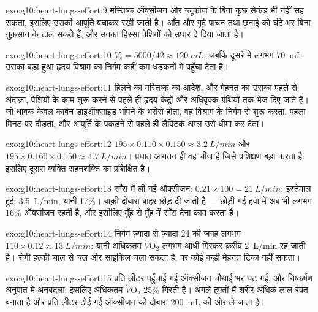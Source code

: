 \begin{solution}{exo:g10:heart-lungs-effort:9}
मस्तिष्क ऑक्सीजन और ग्लूकोज़ के बिना कुछ सेकंड भी नहीं सह सकता, इसलिए
उसकी आपूर्ति बचाकर रखी जाती है। आँत और गुर्दे पाचन तथा छनाई को घंटे भर
बिना नुक़सान के टाल सकते हैं, और उनका हिस्सा पेशियों को उधार दे दिया जाता
है।
\end{solution}

\begin{solution}{exo:g10:heart-lungs-effort:10}
$V_s = 5000/42 \approx \qty{120}{mL}$, जबकि दूसरे में लगभग \qty{70}{mL}:
उसका बड़ा हुआ हृदय विश्राम का निर्गम कहीं कम धड़कनों में पहुँचा देता है।
\end{solution}

\begin{solution}{exo:g10:heart-lungs-effort:11}
हिलने का मस्तिष्क का आदेश, और मेहनत का उसका पहले से अंदाज़ा, पेशियों के
काम शुरू करने से पहले ही हृदय-केंद्रों और अधिवृक्क ग्रंथियों तक भेज दिए
जाते हैं। जो धावक केवल कार्बन डाइऑक्साइड भाँपने के भरोसे होता, वह विश्राम
के निर्गम से शुरू करता, पहला मिनट  पर दौड़ता, और आपूर्ति के पकड़ने
से पहले ही लैक्टिक अम्ल उसे धीमा कर देता।
\end{solution}

\begin{solution}{exo:g10:heart-lungs-effort:12}
$195 \times 0.110 \times 0.150 \approx \qty{3.2}{L/min}$ और
$195 \times 0.160 \times 0.150 \approx \qty{4.7}{L/min}$। प्रघात आयतन ही
वह चीज़ है जिसे प्रशिक्षण बड़ा करता है: इसलिए दूसरा व्यक्ति सहनशक्ति का
प्रशिक्षित है।
\end{solution}

\begin{solution}{exo:g10:heart-lungs-effort:13}
साँस में ली गई ऑक्सीजन: $0.21 \times 100 = \qty{21}{L/min}$; इस्तेमाल
हुई: \qty{3.5}{L/min}, यानी 17\%। बाक़ी दोबारा बाहर छोड़ दी जाती है ---
छोड़ी गई हवा में अब भी लगभग 16\% ऑक्सीजन रहती है, और इसीलिए मुँह से मुँह
में साँस देना काम करता है।
\end{solution}

\begin{solution}{exo:g10:heart-lungs-effort:14}
निर्गम ज़्यादा से ज़्यादा 24 की जगह
लगभग $110 \times 0.12 \approx \qty{13}{L/min}$: यानी अधिकतम $\dot V\!\mathrm{O_2}$ लगभग आधी गिरकर
क़रीब \qty{2}{L/min} रह जाती है। रोगी हल्की चाल से चल और साइकिल चला सकता
है, पर कोई कड़ी मेहनत टिका नहीं सकता।
\end{solution}

\begin{solution}{exo:g10:heart-lungs-effort:15}
प्रति लीटर पहुँचाई गई ऑक्सीजन चौथाई भर घट गई, और निष्कर्षण अनुपात में
अनबदला: इसलिए अधिकतम $\dot V\!\mathrm{O_2}$ 25\% गिरती है। अगले हफ़्तों
में शरीर अधिक लाल रक्त  बनाता है और प्रति लीटर ढोई गई ऑक्सीजन को
दोबारा \qty{200}{mL} की ओर ले जाता है।
\end{solution}

